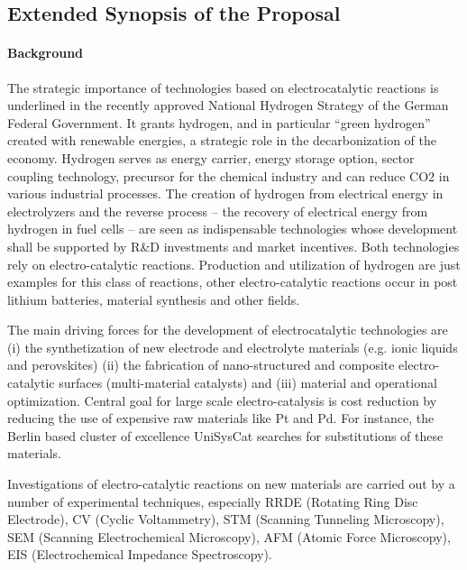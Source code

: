 \documentclass[a4paper,10pt]{article}
\begin{document}
\insertProjectHeader


\subsection*{Extended Synopsis of the Proposal}

\paragraph{Background}



The strategic importance of technologies based on electrocatalytic reactions is underlined in the recently approved National Hydrogen Strategy of the German Federal Government.  It grants hydrogen, and in particular ``green hydrogen'' created with renewable energies, a strategic role in the decarbonization of the economy. Hydrogen serves as energy carrier, energy storage option, sector coupling technology, precursor for the chemical industry and can reduce CO2 in various industrial processes.
The creation of hydrogen from electrical energy in electrolyzers and the reverse process -- the recovery of electrical energy from hydrogen in fuel cells -- are seen as indispensable technologies whose development shall be supported by R\&D investments and market incentives.
%
Both technologies rely on electro-catalytic reactions. Production and utilization of hydrogen are just examples for this class of reactions, other electro-catalytic reactions occur in post lithium batteries, material synthesis and other fields.

The main driving forces for the development of electrocatalytic technologies are (i) the synthetization of new electrode and electrolyte materials (e.g. ionic liquids and perovskites) (ii) the fabrication of nano-structured and composite electro-catalytic surfaces (multi-material catalysts) and (iii) material and operational optimization. Central goal for large scale electro-catalysis is cost
reduction by reducing the use of expensive raw materials like Pt and  Pd. For instance, the Berlin based cluster of excellence UniSysCat searches for substitutions of these materials.

Investigations of electro-catalytic reactions on new materials  
are carried out by a number of  experimental techniques,  especially
RRDE    (Rotating   Ring    Disc   Electrode),   
CV  (Cyclic  Voltammetry),  
STM (Scanning Tunneling Microscopy), 
SEM (Scanning  Electrochemical Microscopy),
AFM (Atomic Force Microscopy), 
EIS (Electrochemical Impedance Spectroscopy).
\end{document}
